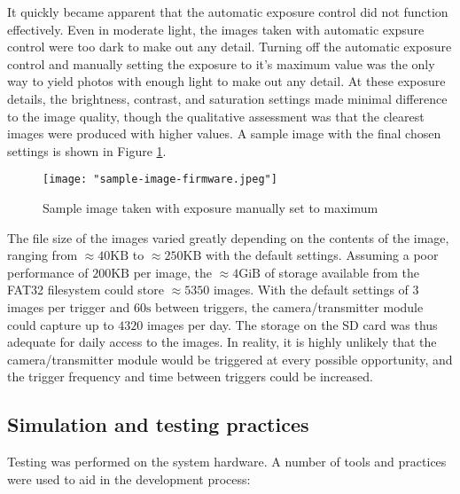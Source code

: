 \documentclass[class=report,11pt,crop=false]{standalone}
\begin{document}
It quickly became apparent that the automatic exposure control did not function effectively. Even in moderate light, the images taken with automatic expsure control were too dark to make out any detail. Turning off the automatic exposure control and manually setting the exposure to it's maximum value was the only way to yield photos with enough light to make out any detail. At these exposure details, the brightness, contrast, and saturation settings made minimal difference to the image quality, though the qualitative assessment was that the clearest images were produced with higher values. A sample image with the final chosen settings is shown in Figure \ref{fig:sample-image-firmware}.

\begin{figure}[ht]
    \centering
    \texttt{[image: "sample-image-firmware.jpeg"]}
    \caption{Sample image taken with exposure manually set to maximum}
    \label{fig:sample-image-firmware}
\end{figure}

The file size of the images varied greatly depending on the contents of the image, ranging from $\approx 40 \mathrm{KB}$ to $\approx 250 \mathrm{KB}$ with the default settings. Assuming a poor performance of $200 \mathrm{KB}$ per image, the $\approx 4 \mathrm{GiB}$ of storage available from the FAT32 filesystem could store $\approx 5350$ images. With the default settings of $3$ images per trigger and $60\mathrm{s}$ between triggers, the camera/transmitter module could capture up to $4320$ images per day. The storage on the SD card was thus adequate for daily access to the images. In reality, it is highly unlikely that the camera/transmitter module would be triggered at every possible opportunity, and the trigger frequency and time between triggers could be increased.

\subsection{Simulation and testing practices}

Testing was performed on the system hardware. A number of tools and practices were used to aid in the development process:
\end{document}
